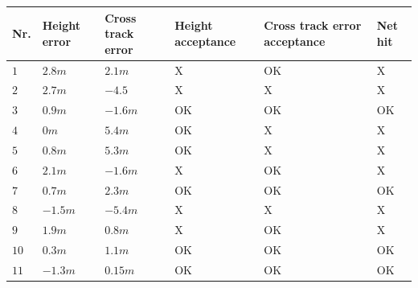 \begin{table}
\centering
\begin{tabular}{| p{0.5cm} | p{1cm} | p{1cm} | p{3.5cm} | p{3cm} | p{1cm} |}
\hline
\textbf{Nr.}	& \textbf{Height error}	& \textbf{Cross track error}& \textbf{Height acceptance}& \textbf{Cross track error acceptance}	& \textbf{Net hit}\\ \hline
$1$				& $2.8 m $	& $2.1 m$	& X								& OK									& X	\\ \hline
$2$				& $2.7 m$	& $-4.5$	&X								& X										& X					\\ \hline
$3$				& $0.9 m$	& $-1.6 m$	&OK							& OK									& OK				\\ \hline
$4$				& $0 m$		& $5.4 m$	&OK							& X										& X					\\ \hline
$5$				& $0.8 m$	& $5.3 m$	&OK							& X										& X					\\ \hline
$6$				& $2.1 m$	& $-1.6 m $	&X								& OK									& X					\\ \hline
$7$				& $0.7 m$	& $2.3 m $	&OK							& OK									& OK				\\ \hline
$8$				& $-1.5 m $ & $-5.4 m $	&X								& X										& X					\\ \hline
$9$				& $1.9 m$	& $0.8 m $	&X								& OK									& X					\\ \hline
$10$			& $0.3 m$	& $1.1 m $	&OK							& OK									& OK				\\ \hline
$11$			& $-1.3 m$	& $0.15 m $	&OK							& OK									& OK				\\ \hline
\end{tabular}
\end{table}
